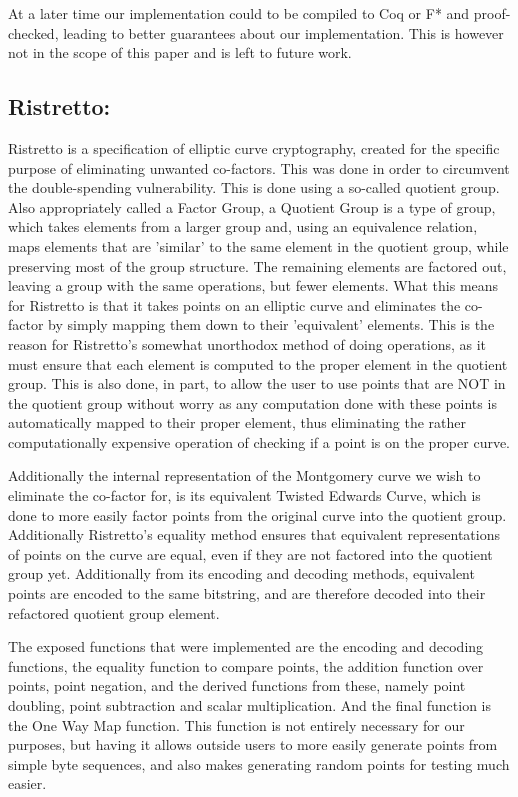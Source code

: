 \documentclass{article}
\begin{document}
At a later time our implementation could to be compiled to Coq or F* and
proof-checked, leading to better guarantees about our implementation.
This is however not in the scope of this paper and is left to future
work. %

\subsection{Ristretto:} \label{ristretto}

Ristretto is a specification of elliptic curve cryptography, created for
the specific purpose of eliminating unwanted co-factors. This was done
in order to circumvent the double-spending vulnerability. This is done
using a so-called quotient group. Also appropriately called a Factor
Group, a Quotient Group is a type of group, which takes elements from a
larger group and, using an equivalence relation, maps elements that are
'similar' to the same element in the quotient group, while preserving
most of the group structure. The remaining elements are factored out,
leaving a group with the same operations, but fewer elements. What
this means for Ristretto is that it takes points on an elliptic curve
and eliminates the co-factor by simply mapping them down to their
'equivalent' elements. This is the reason for Ristretto's somewhat
unorthodox method of doing operations, as it must ensure that each
element is computed to the proper element in the quotient group. This is
also done, in part, to allow the user to use points that are NOT in the
quotient group without worry as any computation done with these points
is automatically mapped to their proper element, thus eliminating the
rather computationally expensive operation of checking if a point is
on the proper curve.

Additionally the internal representation of the Montgomery curve we wish
to eliminate the co-factor for, is its equivalent Twisted Edwards Curve,
which is done to more easily factor points from the original curve into
the quotient group. Additionally Ristretto's equality method ensures
that equivalent representations of points on the curve are equal, even
if they are not factored into the quotient group yet. Additionally
from its encoding and decoding methods, equivalent points are encoded
to the same bitstring, and are therefore decoded into their refactored
quotient group element.

The exposed functions that were implemented are the encoding and decoding
functions, the equality function to compare points, the addition function
over points, point negation, and the derived functions from these,
namely point doubling, point subtraction and scalar multiplication. And
the final function is the One Way Map function. This function is not
entirely necessary for our purposes, but having it allows outside users
to more easily generate points from simple byte sequences, and 
also makes generating random points for testing much easier.
\end{document}
